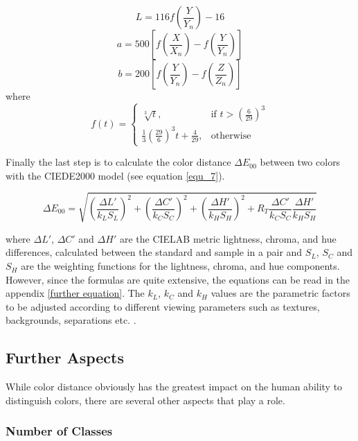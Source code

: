 \begin{equation}\label{equ_3}
L = 116 f\left(\frac{Y}{Y_{n}}\right)-16
\end{equation}
\begin{equation}\label{equ_4}
a = 500 \left[f\left(\frac{X}{X_{n}}\right)-f\left(\frac{Y}{Y_n}\right)\right]
\end{equation}
\begin{equation}\label{equ_5}
b = 200 \left[f\left(\frac{Y}{Y_{n}}\right)-f\left(\frac{Z}{Z_n}\right)\right]
\end{equation}
where
\begin{equation}\label{equ_6}
f(t) =
\begin{cases}
	\sqrt[3]{t}, & \text{if $t > (\frac{6}{29})^{3}$}\\
	\frac{1}{3}(\frac{29}{6})^{3}t+\frac{4}{29}, & \text{otherwise}
\end{cases}
\end{equation}

Finally the last step is to calculate the color distance $\Delta E_{00}$ between two colors with the CIEDE2000 model (see equation \ref{equ_7}).

\begin{equation}\label{equ_7}
\Delta E_{00}= \sqrt{\left(\frac{\Delta L'}{k_{L}S_{L}}\right)^{2}+\left(\frac{\Delta C'}{k_{C}S_{C}}\right)^{2}+\left(\frac{\Delta H'}{k_{H}S_{H}}\right)^{2}+R_{T}\frac{\Delta C'}{k_{C}S_{C}}\frac{\Delta H'}{k_{H}S_{H}}}
\end{equation}

where $\Delta L'$, $\Delta C'$ and $\Delta H'$ are the CIELAB metric lightness, chroma, and hue differences, calculated
between the standard and sample in a pair and $S_{L}$, $S_{C}$ and $S_{H}$ are the weighting functions for the lightness,
chroma, and hue components.  However, since the formulas are quite extensive, the equations can be read in the appendix \ref{further equation}.
The $k_{L}$, $k_{C}$ and $k_{H}$ values are the parametric factors to be adjusted according to different viewing parameters such as textures, backgrounds, separations etc. \parencite{luo2001}.

\subsection{Further Aspects}
While color distance obviously has the greatest impact on the human ability to distinguish colors, there are several other aspects that play a role. 

\subsubsection{Number of Classes}


